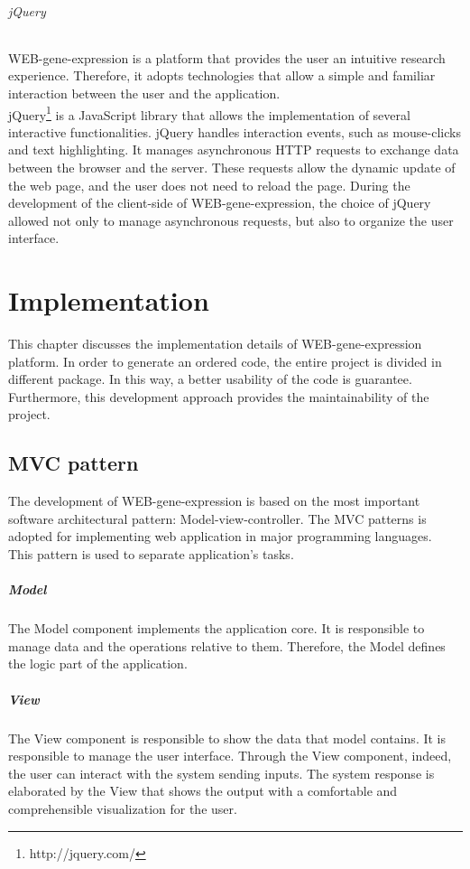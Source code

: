 \documentclass[a4paper]{report}
\begin{document}
\subparagraph{jQuery}
 WEB-gene-expression is a platform that provides the user an intuitive research experience. Therefore, it adopts technologies that allow a simple and familiar interaction between the user and the application.\\
jQuery\footnote{http://jquery.com/} is a JavaScript library that allows the implementation of several interactive functionalities. jQuery handles interaction events, such as mouse-clicks and text highlighting. It manages asynchronous HTTP requests to exchange data between the browser and the server. These requests allow the dynamic update of the web page, and the user does not need to reload the page. During the development of the client-side of WEB-gene-expression, the choice of jQuery allowed not only to manage asynchronous requests, but also to organize the user interface. \\

\chapter{Implementation}
This chapter discusses the implementation details of WEB-gene-expression platform. In order to generate an ordered code, the entire project is divided in different package. In this way, a better usability of the code is guarantee. Furthermore, this development approach provides the maintainability of the project.

\section{MVC pattern} \label{mvc}

The development of WEB-gene-expression is based on the most important software architectural pattern: Model-view-controller. The MVC patterns is adopted for implementing web application in major programming languages.\\
This pattern is used to separate application's tasks.


  \paragraph{Model} The Model component implements the application core. It is responsible to manage data and the operations relative to them. Therefore, the Model defines the logic part of the application.
  \paragraph{View} The View component is responsible to show the data that model contains. It is responsible to manage the user interface. Through the View component, indeed, the user can interact with the system sending inputs. The system response is elaborated by the View that shows the output with a comfortable and comprehensible visualization for the user.
\end{document}
